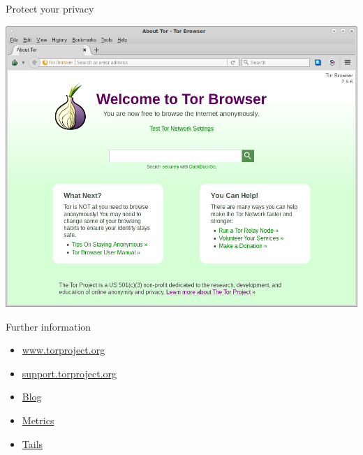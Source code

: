 \documentclass[aspectratio=169,10pt]{beamer}
\begin{document}
  
  \begin{frame}[fragile]{Protect your privacy}
    \begin{center}
      \href{https://www.torproject.org/projects/torbrowser.html.en}{\includegraphics[height=0.85\textheight]{img/torbrowser.png}}
    \end{center}
  \end{frame}
  
  
  \begin{frame}[fragile]{Further information}
    \begin{itemize}
      \item \href{https://www.torproject.org/}{www.torproject.org}
      \item \href{https://support.torproject.org/}{support.torproject.org}
      \item \href{https://blog.torproject.org/}{Blog}
      \item \href{https://metrics.torproject.org/}{Metrics}
      \item \href{https://tails.boum.org/}{Tails}
    \end{itemize}
  \end{frame}
  
  \maketitle
  
\end{document}
